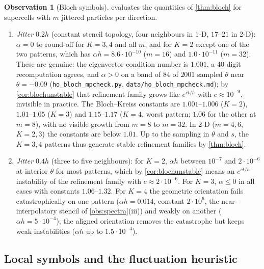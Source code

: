 \documentclass[11pt,a4paper]{article}
\theoremstyle{plain}
\theoremstyle{definition}
\newtheorem{observation}[theorem]{Observation}
\theoremstyle{remark}
\numberwithin{equation}{section}
\begin{document}
\begin{observation}[Bloch symbols]\label{obs:bloch}
 evaluates the quantities of \cref{thm:bloch} for supercells with $m$ jittered particles per direction.
\begin{enumerate}[label=(\roman*)]
\item \emph{Jitter $0.2h$} (constant stencil topology, four neighbours in 1-D, $17$--$21$ in 2-D): $\alpha=0$ to round-off for $K=3,4$ and all $m$, and for $K=2$ except one of the two patterns, which has $\alpha h=8.6\cdot10^{-10}$ ($m=16$) and $1.0\cdot10^{-11}$ ($m=32$). These are genuine: the eigenvector condition number is $1.001$, a 40-digit recomputation agrees, and $\alpha>0$ on a band of $84$ of $2001$ sampled $\theta$ near $\theta=-0.09$ (\texttt{ho\_bloch\_mpcheck.py}, \texttt{data/ho\_bloch\_mpcheck.md}); by \cref{cor:blochunstable} that refinement family grows like $e^{ct/h}$ with $c\approx10^{-9}$, invisible in practice. The Bloch--Kreiss constants are $1.001$--$1.006$ ($K=2$), $1.01$--$1.05$ ($K=3$) and $1.15$--$1.17$ ($K=4$, worst pattern; $1.06$ for the other at $m=8$), with no visible growth from $m=8$ to $m=32$. In 2-D ($m=4,6$, $K=2,3$) the constants are below $1.01$. Up to the sampling in $\theta$ and $s$, the $K=3,4$ patterns thus generate stable refinement families by \cref{thm:bloch}.
\item \emph{Jitter $0.4h$} (three to five neighbours): for $K=2$, $\alpha h$ between $10^{-7}$ and $2\cdot10^{-6}$ at interior $\theta$ for most patterns, which by \cref{cor:blochunstable} means an $e^{ct/h}$ instability of the refinement family with $c\approx2\cdot10^{-6}$. For $K=3$, $\alpha\le0$ in all cases with constants $1.06$--$1.32$. For $K=4$ the geometric orientation fails catastrophically on one pattern ($\alpha h=0.014$, constant $2\cdot10^6$, the near-interpolatory stencil of \cref{obs:spectra}(iii)) and weakly on another ($\alpha h=5\cdot10^{-4}$); the aligned orientation removes the catastrophe but keeps weak instabilities ($\alpha h$ up to $1.5\cdot10^{-4}$).
\end{enumerate}
\end{observation}

\subsection{Local symbols and the fluctuation heuristic}
\end{document}
